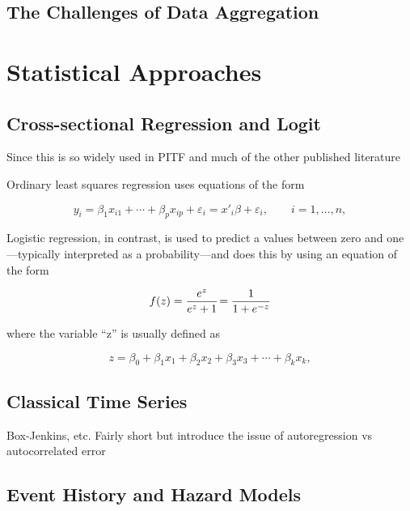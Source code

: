 \documentclass[graybox]{svmult}
\begin{document}
\subsection{The Challenges of Data Aggregation}
\label{subsec:aggregation}


\section{Statistical Approaches}
\label{sec:logit}

\subsection{Cross-sectional Regression and Logit}
\label{sec:logit}

Since this is so widely used in PITF and much of the other published literature

Ordinary least squares regression uses equations of the form

\begin{equation}
 y_i = \beta_1 x_{i1} + \cdots + \beta_p x_{ip} + \varepsilon_i
 = x'_i\beta + \varepsilon_i,
 \qquad i = 1, \ldots, n,
\end{equation}

Logistic regression, in contrast, is used to predict a values between zero and one---typically interpreted as a probability---and does this by using an equation of the form

\begin{equation}
f(z) = \frac{e^{z}}{e^{z} + 1} \! = \frac{1}{1 + e^{-z}} \! \\
\end{equation}

where the variable ``z'' is usually defined as

\begin{equation}
z=\beta_0 + \beta_1x_1 + \beta_2x_2 + \beta_3x_3 + \cdots + \beta_kx_k,
\end{equation}

\subsection{Classical Time Series}
\label{sec:timeseries}

Box-Jenkins, etc. Fairly short but introduce the issue of autoregression vs autocorrelated error

\subsection{Event History and Hazard Models}
\label{subsec:eventhistl}
\end{document}
